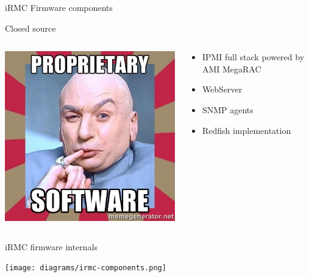 \documentclass{beamer}
\begin{document}
\begin{frame}{iRMC Firmware components}
\begin{block}{Closed source}
		\begin{columns}[onlytextwidth]
			\begin{column}{0.3\textwidth}
				\begin{center}
					\includegraphics[width=\textwidth]{logo/proprietary-software.jpg}
				\end{center}
			\end{column}
			\begin{column}{0.6\textwidth}
				\begin{itemize}
					\item IPMI full stack powered by AMI MegaRAC
					\item WebServer 
					\item SNMP agents
					\item Redfish implementation
				\end{itemize}
			\end{column}
		\end{columns}
	  \end{block}
  \end{frame}

  \begin{frame}{iRMC firmware internals}
	
	\texttt{[image: diagrams/irmc-components.png]}

  \end{frame}
\end{document}
